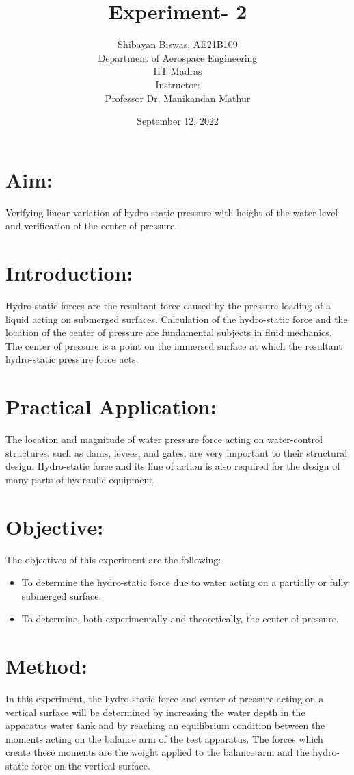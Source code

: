 \documentclass[12pt,a4paper]{article}
\author{ Shibayan Biswas, AE21B109\\ Department of Aerospace Engineering\\ IIT Madras\\[3ex] Instructor:\\ \large Professor Dr. Manikandan Mathur}
\title{Experiment- 2}
\date{September 12, 2022}
\begin{document}
\maketitle

\hline

\section{Aim:}
Verifying linear variation of hydro-static pressure with height of the water level and verification of the center of pressure.
\section{Introduction:}
Hydro-static forces are the resultant force caused by the pressure loading of a liquid acting on submerged surfaces. Calculation of the hydro-static force and the location of the center of pressure are fundamental subjects in fluid mechanics. The center of pressure is a point on the immersed surface at which the resultant hydro-static pressure force acts.
\section{Practical Application:}
The location and magnitude of water pressure force acting on water-control structures, such as dams, levees, and gates, are very important to their structural design. Hydro-static force and its line of action is also required for the design of many parts of hydraulic equipment.
\section{Objective:}
The objectives of this experiment are the following:
\begin{itemize}
\item To determine the hydro-static force due to water acting on a partially or fully submerged surface.
\item To determine, both experimentally and theoretically, the center of pressure.
\end{itemize}
\section{Method:}
In this experiment, the hydro-static force and center of pressure acting on a vertical surface will be determined by increasing the water depth in the apparatus water tank and by reaching an equilibrium condition between the moments acting on the balance arm of the test apparatus. The forces which create these moments are the weight applied to the balance arm and the hydro-static force on the vertical surface.
\end{document}
